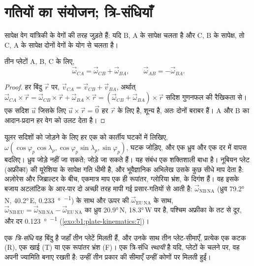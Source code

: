 \section{गतियों का संयोजन; त्रि-संधियाँ}

सापेक्ष वेग यांत्रिकी के वेगों की तरह जुड़ते हैं: यदि B, A के सापेक्ष चलता है और C, B के सापेक्ष, तो C, A के सापेक्ष दोनों वेगों के योग से चलता है।

\begin{proposition}[यूलर सदिश जुड़ते हैं]\label{prop:b1:plate-kinematics:addition}
तीन प्लेटों A, B, C के लिए,
\[
  \vec\omega_{CA} = \vec\omega_{CB} + \vec\omega_{BA}, \qquad
  \vec\omega_{AB} = -\vec\omega_{BA}.
\]
\end{proposition}

\begin{proof}
हर बिंदु $\vec r$ पर, $\vec v_{CA} = \vec v_{CB} + \vec v_{BA}$, अर्थात्
$\vec\omega_{CA}\times\vec r = \vec\omega_{CB}\times\vec r +
\vec\omega_{BA}\times\vec r = (\vec\omega_{CB} + \vec\omega_{BA})\times\vec r$
सदिश गुणनफल की रैखिकता से। एक सदिश $\vec u$ जिसके लिए $\vec u\times\vec r = \vec 0$ हर $\vec r$ के लिए है, शून्य है, अतः दोनों  बराबर हैं। A और B का आदान-प्रदान हर वेग को उलट देता है।
\end{proof}

यूलर सदिशों को जोड़ने के लिए हर एक को कार्तीय घटकों में लिखिए, $\omega(\cos\varphi_p
\cos\lambda_p, \cos\varphi_p\sin\lambda_p, \sin\varphi_p)$, घटक जोड़िए, और एक ध्रुव और एक दर में वापस बदलिए। ध्रुव जोड़े नहीं जा सकते;  जोड़े जा सकते हैं। यह संबंध एक शक्तिशाली बाधा है। नूबियन प्लेट (अफ्रीका) की यूरेशिया के सापेक्ष गति धीमी है, और भूवैज्ञानिक अभिलेख उसके कुछ सीधे माप देता है: अज़ोरेस और जिब्राल्टर के बीच, एकमात्र माप एक ही रूपांतर, ग्लोरिया भ्रंश, के दिगंश हैं। वह इसके बजाय अटलांटिक के आर-पार दो अच्छी तरह मापी गई प्रसार-गतियों से आती है: $\vec\omega_{\mathrm{NB\,NA}}$ (ध्रुव \ang{79.2}\,N, \ang{40.2}\,E, \qty{0.233}{\degree\per\Myr}) के साथ और ऊपर की $\vec\omega_{\mathrm{EU\,NA}}$ के साथ, $\vec\omega_{\mathrm{NB\,EU}} =
\vec\omega_{\mathrm{NB\,NA}} - \vec\omega_{\mathrm{EU\,NA}}$ का ध्रुव \ang{20.9}\,N, \ang{18.3}\,W पर है, पश्चिम अफ्रीका के तट से दूर, और दर \qty{0.123}{\degree\per\Myr} (\cref{exo:b1:plate-kinematics:7})।

\begin{definition}[त्रि-संधि; स्थायी त्रि-संधि]\label{def:b1:plate-kinematics:triple-junction}
एक \emph{त्रि-संधि} वह बिंदु है जहाँ तीन प्लेटें मिलती हैं, और उनके साथ तीन प्लेट-सीमाएँ, प्रत्येक एक कटक (R), एक खाई (T) या एक रूपांतर भ्रंश (F)। एक त्रि-संधि \emph{स्थायी} है यदि, प्लेटों के चलने पर, वह अपनी ज्यामिति बनाए रखती है: उन्हीं तीन प्रकार की सीमाएँ उन्हीं कोणों पर मिलती हुईं।
\end{definition}

